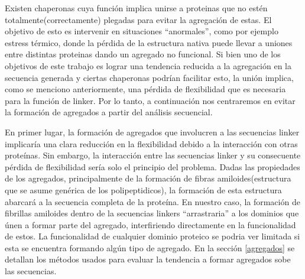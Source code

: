 Existen chaperonas cuya función implica unirse a proteinas que no estén totalmente(correctamente) plegadas para evitar la agregación de estas. 
El objetivo de esto es intervenir en situaciones ``anormales'', como por ejemplo estress térmico, donde la pérdida de la estructura nativa puede llevar a uniones entre distintas proteinas dando un agregado no funcional.
Si bien uno de los objetivos de este trabajo es lograr una tendencia reducida a la agregación en la secuencia generada y 
ciertas chaperonas podrían facilitar esto, la unión implica, como se menciono anteriormente, una pérdida de flexibilidad que es necesaria para la función de linker. 
Por lo tanto, a continuación nos centraremos en evitar la formación de agregados a partir del análisis secuencial.




En primer lugar, la formación de agregados que involucren a las secuencias linker implicaría una clara reducción en la flexibilidad debido a la interacción con otras proteínas.
Sin embargo, la interacción entre las secuencias linker y su consecuente pérdida de flexibilidad sería solo el principio del problema.
Dadas las propiedades de los agregados, principalmente de la formación de fibras amiloides(estructura que se asume genérica de los polipeptidicos), 
la formación de esta estructura abarcará a la secuencia completa de la proteína.
En nuestro caso, la formación de fibrillas amiloides dentro de la secuencias linkers ``arrastraria'' a los dominios que únen a formar parte del agregado, interfiriendo directamente en la funcionalidad de estos. 
La funcionalidad de cualquier dominio proteico se podria ver limitada si esta se encuentra formando algún tipo de agregado.
En la sección \ref{agregados} se detallan los métodos usados para evaluar la tendencia a formar agregados sobe las secuencias.





















